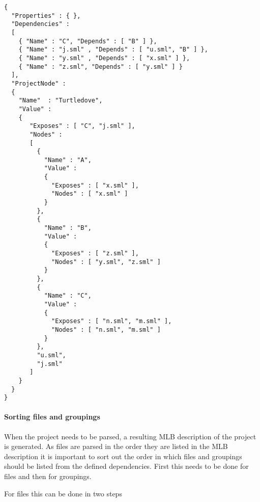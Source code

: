 \begin{example}
\begin{lstlisting}
{
  "Properties" : { },
  "Dependencies" : 
  [
    { "Name" : "C", "Depends" : [ "B" ] },
    { "Name" : "j.sml" , "Depends" : [ "u.sml", "B" ] },
    { "Name" : "y.sml" , "Depends" : [ "x.sml" ] },
    { "Name" : "z.sml", "Depends" : [ "y.sml" ] }
  ],
  "ProjectNode" :
  {
    "Name"  : "Turtledove",
    "Value" : 
    {
       "Exposes" : [ "C", "j.sml" ],
       "Nodes" :
       [
         {
           "Name" : "A",
           "Value" :
           {
             "Exposes" : [ "x.sml" ],
             "Nodes" : [ "x.sml" ]
           }          
         },
         {
           "Name" : "B",
           "Value" :
           {
             "Exposes" : [ "z.sml" ],
             "Nodes" : [ "y.sml", "z.sml" ]
           }          
         },
         {
           "Name" : "C",
           "Value" :
           {
             "Exposes" : [ "n.sml", "m.sml" ],
             "Nodes" : [ "n.sml", "m.sml" ]
           }          
         },
         "u.sml", 
         "j.sml"
       ]
    }
  }
}    
\end{lstlisting}
\end{example}

\paragraph{Sorting files and groupings}

When the project needs to be parsed, a resulting MLB description of the project
is generated. As files are parsed in the order they are listed in the MLB
description it is important to sort out the order in which files and groupings
should be listed from the defined dependencies. First this needs to be done for
files and then for groupings.

For files this can be done in two steps

